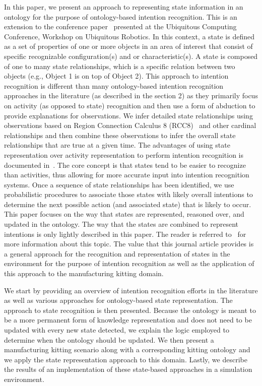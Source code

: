 \documentclass[final,1p,times]{elsarticle}
\begin{document}
In this paper, we present an approach to representing state information in an ontology for the purpose of ontology-based intention recognition. This is an extension to the conference paper~\cite{SCHLENOFF.UBICOMP.2012} presented at the Ubiquitous Computing Conference, Workshop on Ubiquitous Robotics. In this context, a state is defined as a set of properties of one or more objects in an area of interest that consist of specific recognizable configuration(s) and or characteristic(s). A state is composed of one to many state relationships, which is a specific relation between two objects (e.g., Object 1 is on top of Object 2). This approach to intention recognition is different than many ontology-based intention recognition approaches in the literature (as described in the section 2) as they primarily focus on activity (as opposed to state) recognition and then use a form of abduction to provide explanations for observations. We infer detailed state relationships using observations based on Region Connection Calculus 8 (RCC8)~\cite{RANDELL.ICKRR.1992} and other cardinal relationships and then combine these observations to infer the overall state relationships that are true at a given time. The advantages of using state representation over activity representation to perform intention recognition is documented in~\cite{SCHLENOFF.ECDRM.2012}. The core concept is that states tend to be easier to recognize than activities, thus allowing for more accurate input into intention recognition systems. Once a sequence of state relationships has been identified, we use probabilistic procedures to associate those states with likely overall intentions to determine the next possible action (and associated state) that is likely to occur. This paper focuses on the way that states are represented, reasoned over, and updated in the ontology. The way that the states are combined to represent intentions is only lightly described in this paper. The reader is referred to~\cite{SCHLENOFF.ECDRM.2012} for more information about this topic. The value that this journal article provides is a general approach for the recognition and representation of states in the environment for the purpose of intention recognition as well as the application of this approach to the manufacturing kitting domain.

We start by providing an overview of intention recognition efforts in the literature as well as various approaches for ontology-based state representation. The approach to state recognition is then presented. Because the ontology is meant to be a more permanent form of knowledge representation and does not need to be updated with every new state detected, we explain the logic employed to determine when the ontology should be updated. We then present a manufacturing kitting scenario along with a corresponding kitting ontology and we apply the state representation approach to this domain. Lastly, we describe the results of an implementation of these state-based approaches in a simulation environment.
\end{document}
